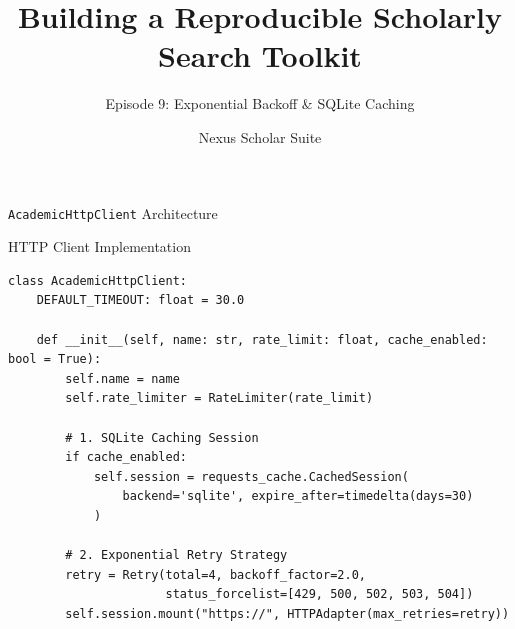 \documentclass[aspectratio=169]{beamer}
\title{Building a Reproducible Scholarly Search Toolkit}
\subtitle{Episode 9: Exponential Backoff \& SQLite Caching}
\author{Nexus Scholar Suite}
\date{}
\begin{document}
\begin{frame}[plain]
  \titlepage
\end{frame}

\begin{frame}{\texttt{AcademicHttpClient} Architecture}
  \begin{center}
  \end{center}
\end{frame}

\begin{frame}[fragile]{HTTP Client Implementation}
\begin{lstlisting}[style=nexuspython]
class AcademicHttpClient:
    DEFAULT_TIMEOUT: float = 30.0

    def __init__(self, name: str, rate_limit: float, cache_enabled: bool = True):
        self.name = name
        self.rate_limiter = RateLimiter(rate_limit)
        
        # 1. SQLite Caching Session
        if cache_enabled:
            self.session = requests_cache.CachedSession(
                backend='sqlite', expire_after=timedelta(days=30)
            )
        
        # 2. Exponential Retry Strategy
        retry = Retry(total=4, backoff_factor=2.0, 
                      status_forcelist=[429, 500, 502, 503, 504])
        self.session.mount("https://", HTTPAdapter(max_retries=retry))
\end{lstlisting}
\end{frame}
\end{document}
